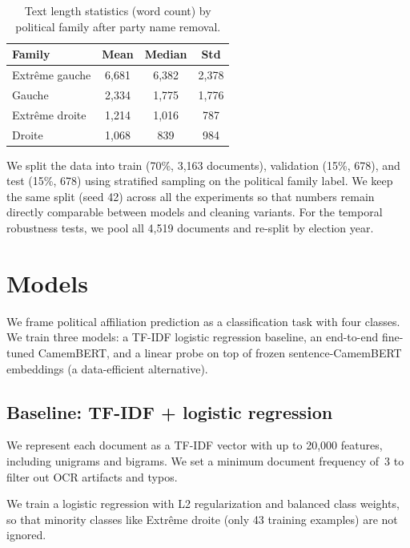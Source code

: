 \documentclass{article}
\begin{document}
\begin{table}[h]
  \caption{Text length statistics (word count) by political family after party name removal.}
  \label{tab:lengths}
  \centering
  \begin{tabular}{lccc}
    \toprule
    Family & Mean & Median & Std \\
    \midrule
    Extr\^{e}me gauche & 6{,}681 & 6{,}382 & 2{,}378 \\
    Gauche              & 2{,}334 & 1{,}775 & 1{,}776 \\
    Extr\^{e}me droite  & 1{,}214 & 1{,}016 & 787 \\
    Droite              & 1{,}068 & 839   & 984 \\
    \bottomrule
  \end{tabular}
\end{table}

We split the data into train (70\%, 3{,}163 documents), validation (15\%, 678), and test (15\%, 678) using stratified sampling on the political family label. We keep the same split (seed 42) across all the experiments so that numbers remain directly comparable between models and cleaning variants. For the temporal robustness tests, we pool all 4{,}519 documents and re-split by election year.

\section{Models}
\label{sec:models}

We frame political affiliation prediction as a classification task with four classes. We train three models: a TF-IDF logistic regression baseline, an end-to-end fine-tuned CamemBERT, and a linear probe on top of frozen sentence-CamemBERT embeddings (a data-efficient alternative).

\subsection{Baseline: TF-IDF + logistic regression}

We represent each document as a TF-IDF vector with up to 20{,}000 features, including unigrams and bigrams. We set a minimum document frequency of~3 to filter out OCR artifacts and typos.

We train a logistic regression with L2 regularization and balanced class weights, so that minority classes like Extr\^{e}me droite (only 43 training examples) are not ignored.
\end{document}
